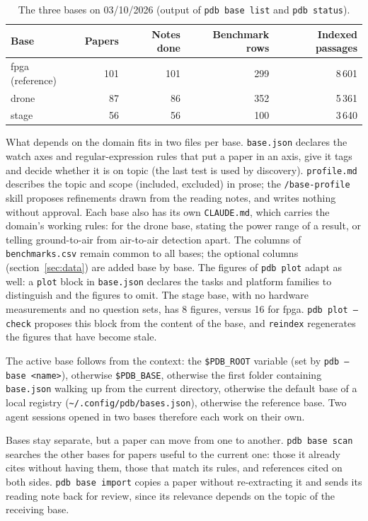 \documentclass[11pt,a4paper]{article}
\newcommand{\cmd}[1]{\texttt{#1}}
\begin{document}
\begin{table}[ht]
\centering
\caption{The three bases on 03/10/2026 (output of \cmd{pdb base list} and \cmd{pdb status}).}
\label{tab:bases}
\small
\begin{tabular}{@{}lrrrr@{}}
\toprule
Base & Papers & Notes done & Benchmark rows & Indexed passages \\
\midrule
fpga (reference) & 101 & 101 & 299 & 8\,601 \\
drone & 87 & 86 & 352 & 5\,361 \\
stage & 56 & 56 & 100 & 3\,640 \\
\bottomrule
\end{tabular}
\end{table}

What depends on the domain fits in two files per base. \cmd{base.json} declares the watch
axes and regular-expression rules that put a paper in an axis, give it tags and decide
whether it is on topic (the last test is used by discovery). \cmd{profile.md} describes the
topic and scope (included, excluded) in prose; the \cmd{/base-profile} skill proposes
refinements drawn from the reading notes, and writes nothing without approval. Each base also
has its own \cmd{CLAUDE.md}, which carries the domain's working rules: for the drone base,
stating the power range of a result, or telling ground-to-air from air-to-air detection
apart. The columns of \cmd{benchmarks.csv} remain common to all bases; the optional columns
(section~\ref{sec:data}) are added base by base. The figures of \cmd{pdb plot} adapt as well:
a \cmd{plot} block in \cmd{base.json} declares the tasks and platform families to
distinguish and the figures to omit. The stage base, with no hardware measurements and no
question sets, has 8 figures, versus 16 for fpga. \cmd{pdb plot --check} proposes this block
from the content of the base, and \cmd{reindex} regenerates the figures that have become
stale.

The active base follows from the context: the \cmd{\$PDB\_ROOT} variable (set by
\cmd{pdb --base <name>}), otherwise \cmd{\$PDB\_BASE}, otherwise the first folder containing
\cmd{base.json} walking up from the current directory, otherwise the default base of a local
registry (\cmd{\textasciitilde/.config/pdb/bases.json}), otherwise the reference base. Two
agent sessions opened in two bases therefore each work on their own.

Bases stay separate, but a paper can move from one to another. \cmd{pdb base scan} searches
the other bases for papers useful to the current one: those it already cites without having
them, those that match its rules, and references cited on both sides. \cmd{pdb base import}
copies a paper without re-extracting it and sends its reading note back for review, since
its relevance depends on the topic of the receiving base.
\end{document}
